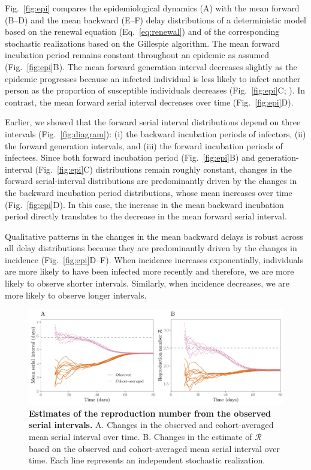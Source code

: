 \documentclass[12pt]{article}
\newcommand{\eref}[1]{Eq.~\ref{eq:#1}}
\newcommand{\fref}[1]{Fig.~\ref{fig:#1}}
\begin{document}
\fref{epi} compares the epidemiological dynamics (A) with the mean forward (B--D) and the mean backward (E--F) delay distributions of a deterministic model based on the renewal equation (\eref{renewal}) and of the corresponding stochastic realizations based on the Gillespie algorithm.
The mean forward incubation period remains constant throughout an epidemic as assumed (\fref{epi}B).
The mean forward generation interval decreases slightly as the epidemic progresses because an infected individual is less likely to infect another person as the proportion of susceptible individuals decreases (\fref{epi}C; \cite{kenah2008generation, champredon2015intrinsic}).
In contrast, the mean forward serial interval decreases over time (\fref{epi}D).

Earlier, we showed that the forward serial interval distributions depend on three intervals (\fref{diagram}): (i) the backward incubation periods of infectors, (ii) the forward generation intervals, and (iii) the forward incubation periods of infectees.
Since both forward incubation period (\fref{epi}B) and generation-interval (\fref{epi}C) distributions remain roughly constant, changes in the forward serial-interval distributions are predominantly driven by the changes in the backward incubation period distributions, whose mean increases over time (\fref{epi}D).
In this case, the increase in the mean backward incubation period directly translates to the decrease in the mean forward serial interval.

Qualitative patterns in the changes in the mean backward delays is robust across all delay distributions because they are predominantly driven by the changes in incidence (\fref{epi}D--F).
When incidence increases exponentially, individuals are more likely to have been infected more recently and therefore, we are more likely to observe shorter intervals.
Similarly, when incidence decreases, we are more likely to observe longer intervals.

\begin{figure}[!ht]
\includegraphics[width=\textwidth]{observedrR.pdf}
\caption{
\textbf{Estimates of the reproduction number from the observed serial intervals.}
A. Changes in the observed and cohort-averaged mean serial interval over time.
B. Changes in the estimate of $\mathcal R$ based on the observed and cohort-averaged mean serial interval over time.
Each line represents an independent stochastic realization.
}
\label{fig:obsrR}
\end{figure}
\end{document}
